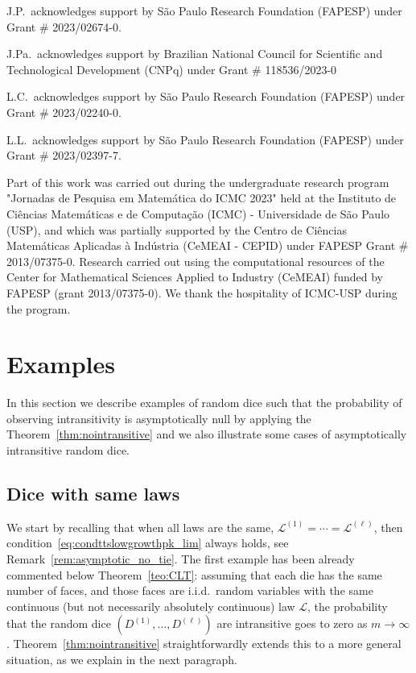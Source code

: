 \documentclass[reqno,a4paper,11pt]{amsart}
\theoremstyle{remark}
\newcommand{\mc}[1]{{\mathcal #1}}
\numberwithin{equation}{section}
\begin{document}
J.P.\ acknowledges support by São Paulo Research Foundation (FAPESP) under Grant \# 2023/02674-0.

J.Pa.\ acknowledges support by Brazilian National Council for Scientific and Technological Development (CNPq) under Grant \# 118536/2023-0

L.C.\ acknowledges support by São Paulo Research Foundation (FAPESP) under Grant
\# 2023/02240-0.

L.L.\ acknowledges support by São Paulo Research Foundation (FAPESP) under Grant
\# 2023/02397-7.

Part of this work was carried out during the undergraduate research program "Jornadas de Pesquisa em Matemática do ICMC 2023" held at the Instituto de Ciências Matemáticas e de Computação (ICMC) - Universidade de São Paulo (USP), and which was partially supported by the Centro de Ciências Matemáticas Aplicadas à Indústria (CeMEAI - CEPID) under FAPESP Grant \# 2013/07375-0. Research carried out using the computational resources of the Center for Mathematical Sciences Applied to Industry (CeMEAI) funded by FAPESP (grant 2013/07375-0). We thank the hospitality of ICMC-USP during the program.



\section{Examples}\label{sec:examples}

In this section we describe  examples of random dice  such that the probability
of observing intransitivity is asymptotically null by applying the
Theorem~\ref{thm:nointransitive} and we also illustrate some cases of
asymptotically intransitive random dice.

\subsection{Dice with same laws}\hfill 


We start by recalling that when all laws are the same, $\mc L^{(1)}=\cdots= \mc
L^{(\ell)}$, then condition~\eqref{eq:condttslowgrowthpk_lim} always holds, see Remark~\ref{rem:asymptotic_no_tie}.
The first example has been already commented below Theorem~\ref{teo:CLT}: assuming that each die has the same number of faces, and those faces are i.i.d.\ random variables with the same continuous (but not necessarily absolutely continuous) law $\mc L$, the probability that the random dice $(D^{(1)},\ldots,D^{(\ell)})$ are intransitive goes to zero as $m\to \infty$.
Theorem~\ref{thm:nointransitive} straightforwardly extends this to a  more general situation, as we explain in the next paragraph.
\end{document}
